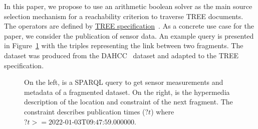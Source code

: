 In this paper, we propose to use an arithmetic boolean solver as the main source selection mechanism for a reachability criterion to traverse TREE documents.
The operators are defined by \href{https://treecg.github.io/specification/}{TREE specification}~.
As a concrete use case for the paper, we consider the publication of sensor data.
An example query is presented in Figure~\ref{lst:system} with the triples representing the link between two fragments.
The dataset was produced from the DAHCC~\cite{dahcc_resource} dataset and adapted to the TREE specification.

\begin{figure}[h]
    \begin{minipage}{0.50\textwidth}
        \centering
        
    \end{minipage}
    \hspace{0.05\textwidth}
    \begin{minipage}{0.43\textwidth}
        \centering
        
    \end{minipage}
    \caption{On the left, is a SPARQL query to get sensor measurements and metadata of a fragmented dataset.
    On the right, is the hypermedia description of the location and constraint of the next fragment.
    The constraint describes publication times ($?t$) where $?t>= \text{2022-01-03T09:47:59.000000}$.}
        \label{lst:system}
\end{figure}